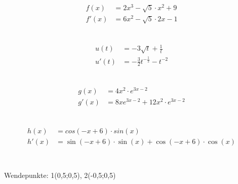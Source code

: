 \documentclass{report}
\begin{document}
\begin{multicols}{2}

\section{}
\subsection{}
\begin{align*}
  f(x)&=2x^3-\sqrt{5}\cdot x^2+9\\
  f'(x)&=6x^2-\sqrt{5}\cdot 2x-1\\
\end{align*}

\subsection{}
\begin{align*}
  u(t)&=-3\sqrt{t}+\frac{1}{t}\\
  u'(t)&=-\frac{3}{2}t^{-\frac{1}{2}}-t^{-2}\\
\end{align*}

\subsection{}
\begin{align*}
  g(x)&=4x^2\cdot e^{3x-2}\\
  g'(x)&=8xe^{3x-2}+12x^2\cdot e^{3x-2}\\
\end{align*}

\subsection{}

\begin{align*}
  h(x)&=cos(-x+6)\cdot sin(x)\\
  h'(x)&=\sin(-x+6)\cdot \sin(x) + \cos(-x +6) \cdot \cos(x)\\
\end{align*}

\section{}
\subsection{}
Wendepunkte: 1(0,5;0,5), 2(-0,5;0,5)


\end{multicols}
\end{document}
